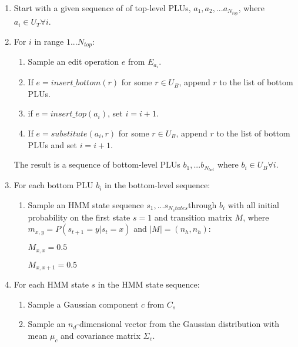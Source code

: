 \documentclass[11pt]{article}
\newcommand{\myindent}{\hspace{2cm}}
\begin{document}
\begin{enumerate}

\item Start with a given sequence of of top-level PLUs, $a_1, a_2, ... a_{N_{top}}$, where $a_i \in U_T \forall i$.

\item For $i$ in range $1...N_{top}$:
\begin{enumerate}
	\item Sample an edit operation $e$ from $E_{a_i}$.
	\item If $e = insert\_bottom(r)$ for some $r \in U_B$, append $r$ to the list of bottom PLUs.
	\item if $e = insert\_top(a_i)$, set $i=i+1$.
	\item If $e = substitute(a_i,r)$ for some $r \in U_B$, append $r$ to the list of bottom PLUs and set $i=i+1$.
\end{enumerate}

The result is a sequence of bottom-level PLUs $b_1,...b_{N_{bot}}$ where $b_i \in U_B \forall i$.

\item For each bottom PLU $b_i$ in the bottom-level sequence:
\begin{enumerate}
\item Sample an HMM state sequence $s_1,...s_{N_states}$through $b_i$ with all initial probability on the first state $s=1$ and transition matrix $M$, where $m_{x,y}=P(s_{t+1}=y|s_t=x)$ and $|M|=(n_h,n_h)$:

\myindent $M_{x,x}=0.5$

\myindent $M_{x,x+1}=0.5$

\end{enumerate}

\item For each HMM state $s$ in the HMM state sequence: 
\begin{enumerate}
\item Sample a Gaussian component $c$ from $C_s$

\item Sample an $n_d$-dimensional vector from the Gaussian distribution with mean $\mu_c$ and covariance matrix $\Sigma_c$.

\end{enumerate}

\end{enumerate}
\end{document}
